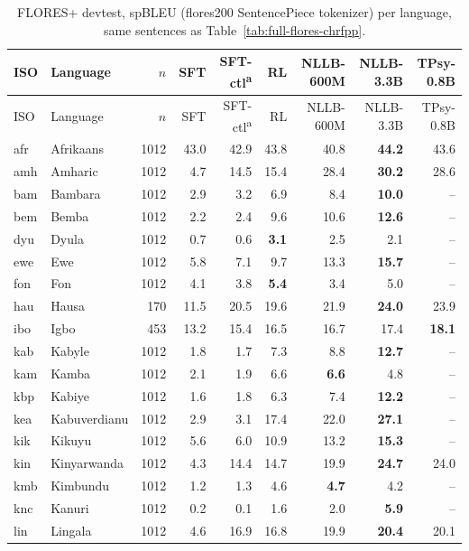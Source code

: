 {\footnotesize\setlength{\tabcolsep}{3pt}
\begin{longtable}{@{}llrrrrrrr@{}}
\caption{FLORES+ devtest, spBLEU (flores200 SentencePiece tokenizer) per language, same sentences as Table~\ref{tab:full-flores-chrfpp}.}\label{tab:full-flores-spbleu}\\
\toprule
ISO & Language & $n$ & SFT & SFT-ctl\textsuperscript{a} & RL & NLLB-600M & NLLB-3.3B & TPsy-0.8B \\
\midrule\endfirsthead
\toprule
ISO & Language & $n$ & SFT & SFT-ctl\textsuperscript{a} & RL & NLLB-600M & NLLB-3.3B & TPsy-0.8B \\
\midrule\endhead
\midrule\endfoot
\bottomrule\endlastfoot
afr & Afrikaans & 1012 & 43.0 & 42.9 & 43.8 & 40.8 & \textbf{44.2} & 43.6 \\
amh & Amharic & 1012 & 4.7 & 14.5 & 15.4 & 28.4 & \textbf{30.2} & 28.6 \\
bam & Bambara & 1012 & 2.9 & 3.2 & 6.9 & 8.4 & \textbf{10.0} & -- \\
bem & Bemba & 1012 & 2.2 & 2.4 & 9.6 & 10.6 & \textbf{12.6} & -- \\
dyu & Dyula & 1012 & 0.7 & 0.6 & \textbf{3.1} & 2.5 & 2.1 & -- \\
ewe & Ewe & 1012 & 5.8 & 7.1 & 9.7 & 13.3 & \textbf{15.7} & -- \\
fon & Fon & 1012 & 4.1 & 3.8 & \textbf{5.4} & 3.4 & 5.0 & -- \\
hau & Hausa & 170 & 11.5 & 20.5 & 19.6 & 21.9 & \textbf{24.0} & 23.9 \\
ibo & Igbo & 453 & 13.2 & 15.4 & 16.5 & 16.7 & 17.4 & \textbf{18.1} \\
kab & Kabyle & 1012 & 1.8 & 1.7 & 7.3 & 8.8 & \textbf{12.7} & -- \\
kam & Kamba & 1012 & 2.1 & 1.9 & 6.6 & \textbf{6.6} & 4.8 & -- \\
kbp & Kabiye & 1012 & 1.6 & 1.8 & 6.3 & 7.4 & \textbf{12.2} & -- \\
kea & Kabuverdianu & 1012 & 2.9 & 3.1 & 17.4 & 22.0 & \textbf{27.1} & -- \\
kik & Kikuyu & 1012 & 5.6 & 6.0 & 10.9 & 13.2 & \textbf{15.3} & -- \\
kin & Kinyarwanda & 1012 & 4.3 & 14.4 & 14.7 & 19.9 & \textbf{24.7} & 24.0 \\
kmb & Kimbundu & 1012 & 1.2 & 1.3 & 4.6 & \textbf{4.7} & 4.2 & -- \\
knc & Kanuri & 1012 & 0.2 & 0.1 & 1.6 & 2.0 & \textbf{5.9} & -- \\
lin & Lingala & 1012 & 4.6 & 16.9 & 16.8 & 19.9 & \textbf{20.4} & 20.1 \\

\end{longtable}}
